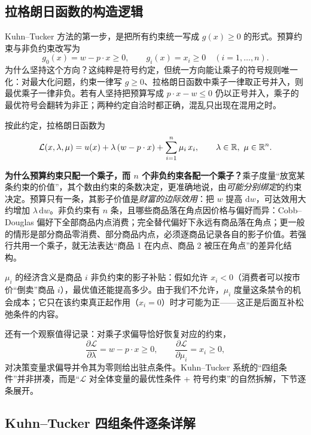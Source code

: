 \subsection{拉格朗日函数的构造逻辑}
\label{sec:lagrange-build}

Kuhn--Tucker 方法的第一步，是把所有约束统一写成 $g(x)\ge 0$ 的形式。预算约束与非负约束改写为
\[
 g_0(x)=w-p\cdot x\ge 0,
 \qquad
 g_i(x)=x_i\ge 0\quad(i=1,\dots,n).
\]
为什么坚持这个方向？这纯粹是符号约定，但统一方向能让乘子的符号规则唯一化：对最大化问题，约束一律写 $g\ge 0$、拉格朗日函数中乘子一律取正号并入，则最优乘子一律非负。若有人坚持把预算写成 $p\cdot x-w\le 0$ 仍以正号并入，乘子的最优符号会翻转为非正；两种约定自洽时都正确，混乱只出现在混用之时。

按此约定，拉格朗日函数为
\begin{equation}
 \mathcal L(x,\lambda,\mu)
 =u(x)+\lambda\,(w-p\cdot x)+\sum_{i=1}^n\mu_i\,x_i,
 \qquad \lambda\in\mathbb{R},\ \mu\in\mathbb{R}^n.
 \label{eq:lagrangian}
\end{equation}

\textbf{为什么预算约束只配一个乘子，而 $n$ 个非负约束各配一个乘子？}乘子度量“放宽某条约束的价值”，其个数由约束的条数决定，更准确地说，由\emph{可能分别绑定}的约束决定。预算只有一条，其影子价值是\emph{财富的边际效用}：把 $w$ 提高 $\mathrm dw$，可达效用大约增加 $\lambda\,\mathrm dw$。非负约束有 $n$ 条，且哪些商品落在角点因价格与偏好而异：Cobb--Douglas 偏好下全部商品内点消费；完全替代偏好下永远有商品落在角点；更一般的情形是部分商品零消费、部分商品内点，必须逐商品记录各自的影子价值。若强行共用一个乘子，就无法表达“商品 1 在内点、商品 2 被压在角点”的差异化结构。

$\mu_i$ 的经济含义是商品 $i$ 非负约束的影子补贴：假如允许 $x_i<0$（消费者可以按市价“倒卖”商品 $i$），最优值还能提高多少。由于我们不允许，$\mu_i$ 度量这条禁令的机会成本；它只在该约束真正起作用（$x_i=0$）时才可能为正——这正是后面互补松弛条件的内容。

还有一个观察值得记录：对乘子求偏导恰好恢复对应的约束，
\[
 \frac{\partial\mathcal L}{\partial\lambda}=w-p\cdot x\ge 0,
 \qquad
 \frac{\partial\mathcal L}{\partial\mu_i}=x_i\ge 0,
\]
对决策变量求偏导并令其为零则给出驻点条件。Kuhn--Tucker 系统的“四组条件”并非拼凑，而是“$\mathcal L$ 对全体变量的最优性条件 + 符号约束”的自然拆解，下节逐条展开。

\subsection{Kuhn--Tucker 四组条件逐条详解}
\label{sec:kt-conditions}


